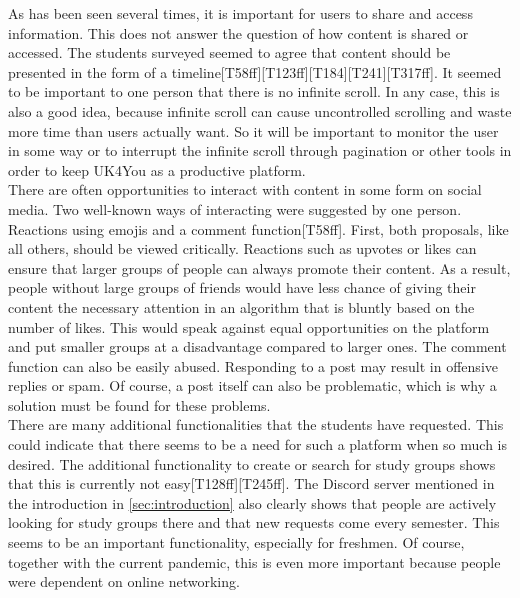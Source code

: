 As has been seen several times, it is important for users to share and access information.
This does not answer the question of how content is shared or accessed.
The students surveyed seemed to agree that content should be presented in the form of a timeline[T58ff][T123ff][T184][T241][T317ff].
It seemed to be important to one person that there is no infinite scroll.
In any case, this is also a good idea, because infinite scroll can cause uncontrolled scrolling and waste more time than users actually want\cite{infinite-scroll-effect}.
So it will be important to monitor the user in some way or to interrupt the infinite scroll through pagination or other tools in order to keep UK4You as a productive platform.\\

There are often opportunities to interact with content in some form on social media.
Two well-known ways of interacting were suggested by one person.
Reactions using emojis and a comment function[T58ff].
First, both proposals, like all others, should be viewed critically.
Reactions such as upvotes or likes can ensure that larger groups of people can always promote their content.
As a result, people without large groups of friends would have less chance of giving their content the necessary attention in an algorithm that is bluntly based on the number of likes.
This would speak against equal opportunities on the platform and put smaller groups at a disadvantage compared to larger ones.
The comment function can also be easily abused.
Responding to a post may result in offensive replies or spam.
Of course, a post itself can also be problematic, which is why a solution must be found for these problems.\\

There are many additional functionalities that the students have requested.
This could indicate that there seems to be a need for such a platform when so much is desired.
The additional functionality to create or search for study groups shows that this is currently not easy[T128ff][T245ff].
The Discord server mentioned in the introduction in \autoref{sec:introduction} also clearly shows that people are actively looking for study groups there and that new requests come every semester.
This seems to be an important functionality, especially for freshmen.
Of course, together with the current pandemic, this is even more important because people were dependent on online networking.\\

